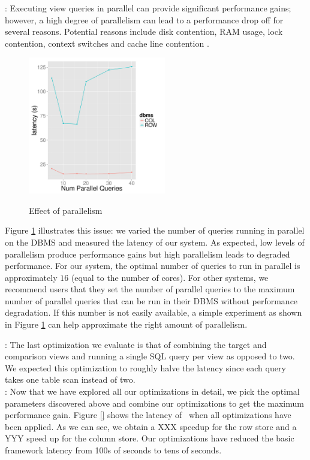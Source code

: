 : 
Executing view queries in parallel can provide significant performance gains;
however, a high degree of parallelism can lead to a performance drop off for
several reasons. Potential reasons include disk contention, RAM usage, lock
contention, context switches and cache line contention \cite{Postgres_wiki}. 

\begin{figure}[h]
\centering
{\includegraphics[width=6cm] {Images/parallel_noop.pdf}}
\caption{Effect of parallelism}
\label{fig:parallelism}
\end{figure} 

Figure \ref{fig:parallelism} illustrates this issue: we varied the number of
queries running in parallel on the DBMS and measured the latency of our system.
As expected, low levels of parallelism produce performance gains but high
parallelism leads to degraded performance.
For our system, the optimal number of queries to run in parallel is
approximately $16$ (equal to the number of cores).
For other systems, we recommend users that they set the number of parallel
queries to the maximum number of parallel queries that can be run in
their DBMS without performance degradation.
If this number is not easily available, a simple experiment as shown in Figure
\ref{fig:parallelism} can help approximate the right amount of parallelism. 

:
The last optimization we evaluate is that of combining the target and comparison
views and running a single SQL query per view as opposed to two.
We expected this optimization to roughly halve the latency since each query
takes one table scan instead of two.\\

:
Now that we have explored all our optimizations in detail, we pick the optimal
parameters discovered above and combine our optimizations to get the maximum
performance gain.
Figure \ref{} shows the latency of \VizRecDB\ when all optimizations have been
applied.
As we can see, we obtain a XXX speedup for the row store and a YYY speed up for
the column store.
Our optimizations have reduced the basic framework latency from 100s of seconds
to tens of seconds.

